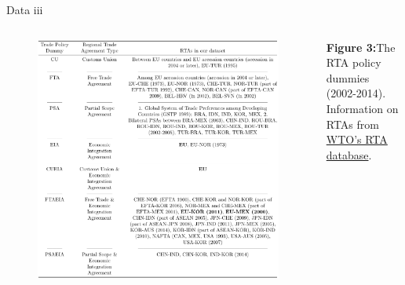 \documentclass[10pt]{beamer}
\begin{document}
\begin{frame}{Data iii} 
\begin{columns}
      \begin{figure}
    \includegraphics[scale=0.4]{data_rta.png} %
    \caption{}
      \end{figure}
    \textbf{Figure 3:}The RTA policy dummies (2002-2014). \\ Information on RTAs from 
    \href{http://rtais.wto.org/UI/PublicMaintainRTAHome.aspx}{WTO's RTA database}.
\end{columns}
\end{frame}
\end{document}
